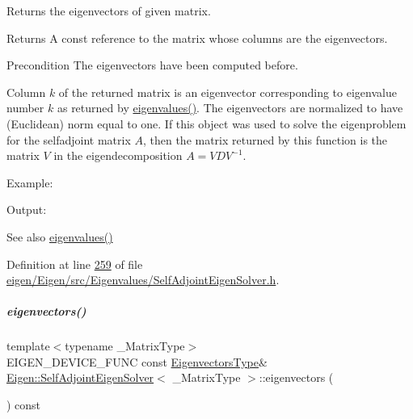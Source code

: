 Returns the eigenvectors of given matrix. 

\begin{DoxyReturn}{Returns}
A const reference to the matrix whose columns are the eigenvectors.
\end{DoxyReturn}
\begin{DoxyPrecond}{Precondition}
The eigenvectors have been computed before.
\end{DoxyPrecond}
Column $ k $ of the returned matrix is an eigenvector corresponding to eigenvalue number $ k $ as returned by \hyperlink{group___eigenvalues___module_a8efab27e82aa6aa0ae0c64739238c2e0}{eigenvalues()}. The eigenvectors are normalized to have (Euclidean) norm equal to one. If this object was used to solve the eigenproblem for the selfadjoint matrix $ A $, then the matrix returned by this function is the matrix $ V $ in the eigendecomposition $ A = V D V^{-1} $.

Example\+: 
\begin{DoxyCodeInclude}
\end{DoxyCodeInclude}
 Output\+: 
\begin{DoxyVerbInclude}
\end{DoxyVerbInclude}


\begin{DoxySeeAlso}{See also}
\hyperlink{group___eigenvalues___module_a8efab27e82aa6aa0ae0c64739238c2e0}{eigenvalues()} 
\end{DoxySeeAlso}


Definition at line \hyperlink{eigen_2_eigen_2src_2_eigenvalues_2_self_adjoint_eigen_solver_8h_source_l00259}{259} of file \hyperlink{eigen_2_eigen_2src_2_eigenvalues_2_self_adjoint_eigen_solver_8h_source}{eigen/\+Eigen/src/\+Eigenvalues/\+Self\+Adjoint\+Eigen\+Solver.\+h}.

\mbox{\label{group___eigenvalues___module_a7b9f7e641fa46ac4c5f2371405c69b2b}} 
\subparagraph{\texorpdfstring{eigenvectors()}{eigenvectors()}\hspace{0.1cm}{\footnotesize\ttfamily [2/2]}}
{\footnotesize\ttfamily template$<$typename \+\_\+\+Matrix\+Type$>$ \\
E\+I\+G\+E\+N\+\_\+\+D\+E\+V\+I\+C\+E\+\_\+\+F\+U\+NC const \hyperlink{group___core___module}{Eigenvectors\+Type}\& \hyperlink{group___eigenvalues___module_class_eigen_1_1_self_adjoint_eigen_solver}{Eigen\+::\+Self\+Adjoint\+Eigen\+Solver}$<$ \+\_\+\+Matrix\+Type $>$\+::eigenvectors (\begin{DoxyParamCaption}{ }\end{DoxyParamCaption}) const\hspace{0.3cm}{\ttfamily [inline]}}



